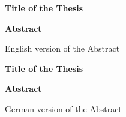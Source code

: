 \thispagestyle{plain}
\begin{center}
    \Large
    \textbf{Title of the Thesis}
    
    \vspace{0.9cm}
    \textbf{Abstract}
\end{center}
English version of the Abstract

\newpage
\thispagestyle{plain}
\begin{center}
    \Large
    \textbf{Title of the Thesis}
    
    \vspace{0.9cm}
    \textbf{Abstract}
\end{center}

German version of the Abstract


\newpage